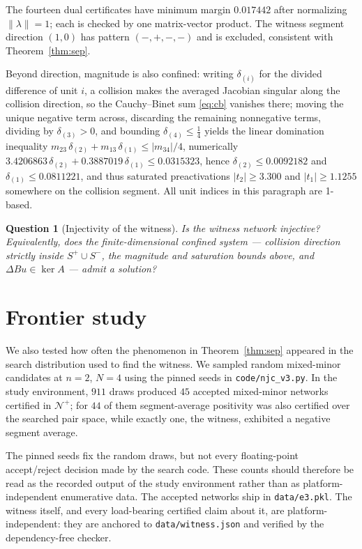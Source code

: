 \documentclass[11pt]{article}
\newtheorem{question}[theorem]{Question}
\theoremstyle{definition}
\theoremstyle{remark}
\begin{document}
The fourteen dual certificates have minimum margin $0.017442$ after
normalizing $\|\lambda\|=1$; each is checked by one matrix-vector
product. The witness segment direction $(1,0)$ has pattern $(-,+,-,-)$
and is excluded, consistent with Theorem~\ref{thm:sep}.

Beyond direction, magnitude is also confined: writing $\delta_{(i)}$
for the divided difference of unit $i$, a collision makes the averaged
Jacobian singular along the collision direction, so the Cauchy--Binet
sum \eqref{eq:cb} vanishes there; moving the unique negative term
across, discarding the remaining nonnegative terms, dividing by
$\delta_{(3)}>0$, and bounding $\delta_{(4)}\le\tfrac14$ yields the
linear domination inequality
$m_{23}\,\delta_{(2)}+m_{13}\,\delta_{(1)}\le|m_{34}|/4$, numerically
$3.4206863\,\delta_{(2)}+0.3887019\,\delta_{(1)}\le 0.0315323$, hence
$\delta_{(2)}\le 0.0092182$ and $\delta_{(1)}\le 0.0811221$, and thus
saturated preactivations $|t_2|\ge3.300$ and $|t_1|\ge1.1255$ somewhere
on the collision segment. All unit indices in this paragraph are 1-based.

\begin{question}[Injectivity of the witness]\label{q:witness}
Is the witness network injective? Equivalently, does the finite-dimensional confined system
--- collision direction strictly inside $S^{+}\cup S^{-}$, the magnitude
and saturation bounds above, and $\Delta Bu\in\ker A$ --- admit a solution?
\end{question}

\section{Frontier study}\label{sec:frontier}

We also tested how often the phenomenon in Theorem~\ref{thm:sep}
appeared in the search distribution used to find the witness. We
sampled random mixed-minor candidates at $n=2$, $N=4$ using the pinned
seeds in \texttt{code/njc\_v3.py}. In the study environment, $911$
draws produced $45$ accepted mixed-minor networks certified in
$\mathcal N^{+}$; for $44$ of them segment-average positivity was also
certified over the searched pair space, while exactly one, the witness,
exhibited a negative segment average.

The pinned seeds fix the random draws, but not every floating-point
accept/reject decision made by the search code. These counts should
therefore be read as the recorded output of the study environment
rather than as platform-independent enumerative data. The accepted
networks ship in \texttt{data/e3.pkl}. The witness itself, and every
load-bearing certified claim about it, are platform-independent: they
are anchored to \texttt{data/witness.json} and verified by the
dependency-free checker.
\end{document}
